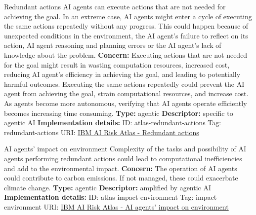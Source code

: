 \documentclass[a4paper,12pt]{article}
\begin{document}
\begin{definitionbox}{Redundant actions}
AI agents can execute actions that are not needed for achieving the goal. In an extreme case, AI agents might enter a cycle of executing the same actions repeatedly without any progress. This could happen because of unexpected conditions in the environment, the AI agent's failure to reflect on its action, AI agent reasoning and planning errors or the AI agent's lack of knowledge about the problem.\newline\newline
\textbf{Concern: }Executing actions that are not needed for the goal might result in wasting computation resources, increased cost, reducing AI agent's efficiency in achieving the goal, and leading to potentially harmful outcomes. Executing the same actions repeatedly could prevent the AI agent from achieving the goal, strain computational resources, and increase cost. As agents become more autonomous, verifying that AI agents operate efficiently becomes increasing time consuming.\newline\newline
\textbf{Type: }agentic\newline
\textbf{Descriptor: }specific to agentic AI \newline\newline
\textbf{Implementation details: } \newline
ID: atlas-redundant-actions \newline
Tag: redundant-actions \newline
URI:  \href{https://www.ibm.com/docs/en/watsonx/saas?topic=SSYOK8/wsj/ai-risk-atlas/redundant-actions.html}{IBM AI Risk Atlas - Redundant actions}\newline
\end{definitionbox}
\begin{definitionbox}{AI agents' impact on environment}
Complexity of the tasks and possibility of AI agents performing redundant actions could lead to computational inefficiencies and add to the environmental impact.\newline\newline
\textbf{Concern: }The operation of AI agents could contribute to carbon emissions. If not managed, these could exacerbate climate change.\newline\newline
\textbf{Type: }agentic\newline
\textbf{Descriptor: }amplified by agentic AI \newline\newline
\textbf{Implementation details: } \newline
ID: atlas-impact-environment \newline
Tag: impact-environment \newline
URI:  \href{https://www.ibm.com/docs/en/watsonx/saas?topic=SSYOK8/wsj/ai-risk-atlas/impact-environment.html}{IBM AI Risk Atlas - AI agents' impact on environment}\newline
\end{definitionbox}
\end{document}

